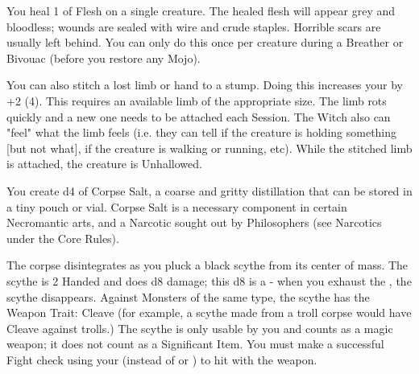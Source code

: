{\NECRO[
  Name=Knit Flesh,
  Link=necromancy-knit-flesh,
  Paradigm=Death,
  Save=N,
  Duration=0 or Session,
  Target=2 (see below)
]

You heal 1 \HD of Flesh on a single creature. The healed flesh will appear grey and bloodless; wounds are sealed with wire and crude staples.  Horrible scars are usually left behind. You can only do this once per creature during a Breather or Bivouac (before you restore any Mojo).

You can also stitch a lost limb or hand to a stump.  Doing this increases your  by +2 (4).   This requires an available limb of the appropriate size.  The limb rots quickly and a new one needs to be attached each Session.  The Witch also can "feel" what the limb feels (i.e. they can tell if the creature is holding something [but not what], if the creature is walking or running, etc).  While the stitched limb is attached, the creature is Unhallowed.





\NECRO[
  Name=Corpse Salt,
  Link=necromancy-corpse-salt,
  Paradigm=Death,
  Save=N,
  Duration=0,
  Target=2
]

You create d4 \UD of Corpse Salt, a coarse and gritty distillation that can be stored in a tiny pouch or vial.  Corpse Salt is a necessary component in certain Necromantic arts, and a Narcotic sought out by Philosophers (see Narcotics under the Core Rules).


\NECRO[
  Name=Death Scythe,
  Link=necromancy-death-scythe
  Paradigm=Death,
  Save=N,
  Duration=Session or Until Exhausted,
  Target=4
]


The corpse disintegrates as you pluck a black scythe from its center of mass. The scythe is 2 Handed and does d8 damage; this d8 is a \UD - when you exhaust the \UD, the scythe disappears.  Against Monsters of the same type, the scythe has the Weapon Trait: Cleave (for example, a scythe made from a troll corpse would have Cleave against trolls.) The scythe is only usable by you and counts as a magic weapon; it does not count as a Significant Item. You must make a successful Fight check using your \FOC (instead of \VIG or \DEX) to hit with the weapon.

\NECRO[
  Name=Exploding Corpse,
  Link=necromancy-exploding-corpse,
  Paradigm=Death,
  Save=N,
  Duration=Combat,
  Target=3
]

}
